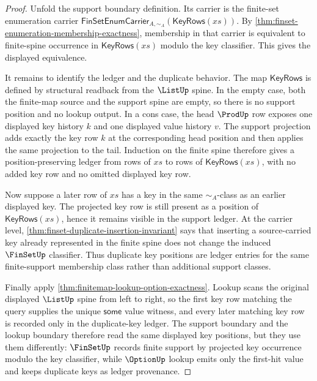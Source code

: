 \begin{proof}
Unfold the support boundary definition. Its carrier is the finite-set enumeration carrier $\mathsf{FinSetEnumCarrier}_{A,\sim_A}(\mathsf{KeyRows}(xs))$. By \autoref{thm:finset-enumeration-membership-exactness}, membership in that carrier is equivalent to finite-spine occurrence in $\mathsf{KeyRows}(xs)$ modulo the key classifier. This gives the displayed equivalence.

It remains to identify the ledger and the duplicate behavior. The map $\mathsf{KeyRows}$ is defined by structural readback from the $\ListUp$ spine. In the empty case, both the finite-map source and the support spine are empty, so there is no support position and no lookup output. In a cons case, the head $\ProdUp$ row exposes one displayed key history $k$ and one displayed value history $v$. The support projection adds exactly the key row $k$ at the corresponding head position and then applies the same projection to the tail. Induction on the finite spine therefore gives a position-preserving ledger from rows of $xs$ to rows of $\mathsf{KeyRows}(xs)$, with no added key row and no omitted displayed key row.

Now suppose a later row of $xs$ has a key in the same $\sim_A$-class as an earlier displayed key. The projected key row is still present as a position of $\mathsf{KeyRows}(xs)$, hence it remains visible in the support ledger. At the carrier level, \autoref{thm:finset-duplicate-insertion-invariant} says that inserting a source-carried key already represented in the finite spine does not change the induced $\FinSetUp$ classifier. Thus duplicate key positions are ledger entries for the same finite-support membership class rather than additional support classes.

Finally apply \autoref{thm:finitemap-lookup-option-exactness}. Lookup scans the original displayed $\ListUp$ spine from left to right, so the first key row matching the query supplies the unique $\mathsf{some}$ value witness, and every later matching key row is recorded only in the duplicate-key ledger. The support boundary and the lookup boundary therefore read the same displayed key positions, but they use them differently: $\FinSetUp$ records finite support by projected key occurrence modulo the key classifier, while $\OptionUp$ lookup emits only the first-hit value and keeps duplicate keys as ledger provenance.
\end{proof}

